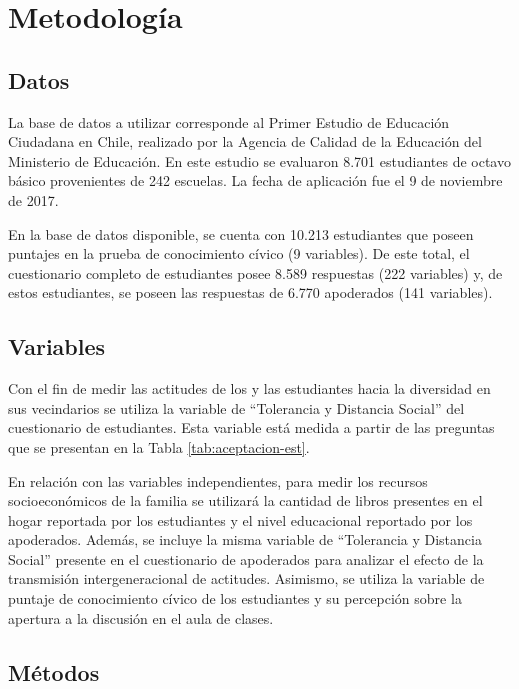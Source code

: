 \documentclass[12pt,twoside]{templates/facsothesis}
\begin{document}
\hypertarget{metodologuxeda}{%
\chapter{Metodología}\label{metodologuxeda}}

\hypertarget{datos}{%
\section{Datos}\label{datos}}

La base de datos a utilizar corresponde al Primer Estudio de Educación Ciudadana en Chile, realizado por la Agencia de Calidad de la Educación del Ministerio de Educación. En este estudio se evaluaron 8.701 estudiantes de octavo básico provenientes de 242 escuelas. La fecha de aplicación fue el 9 de noviembre de 2017.

En la base de datos disponible, se cuenta con 10.213 estudiantes que poseen puntajes en la prueba de conocimiento cívico (9 variables). De este total, el cuestionario completo de estudiantes posee 8.589 respuestas (222 variables) y, de estos estudiantes, se poseen las respuestas de 6.770 apoderados (141 variables).

\hypertarget{variables}{%
\section{Variables}\label{variables}}

Con el fin de medir las actitudes de los y las estudiantes hacia la diversidad en sus vecindarios se utiliza la variable de ``Tolerancia y Distancia Social'' del cuestionario de estudiantes. Esta variable está medida a partir de las preguntas que se presentan en la Tabla \ref{tab:aceptacion-est}.

En relación con las variables independientes, para medir los recursos socioeconómicos de la familia se utilizará la cantidad de libros presentes en el hogar reportada por los estudiantes y el nivel educacional reportado por los apoderados. Además, se incluye la misma variable de ``Tolerancia y Distancia Social'' presente en el cuestionario de apoderados para analizar el efecto de la transmisión intergeneracional de actitudes. Asimismo, se utiliza la variable de puntaje de conocimiento cívico de los estudiantes y su percepción sobre la apertura a la discusión en el aula de clases.

\hypertarget{muxe9todos}{%
\section{Métodos}\label{muxe9todos}}
\end{document}
